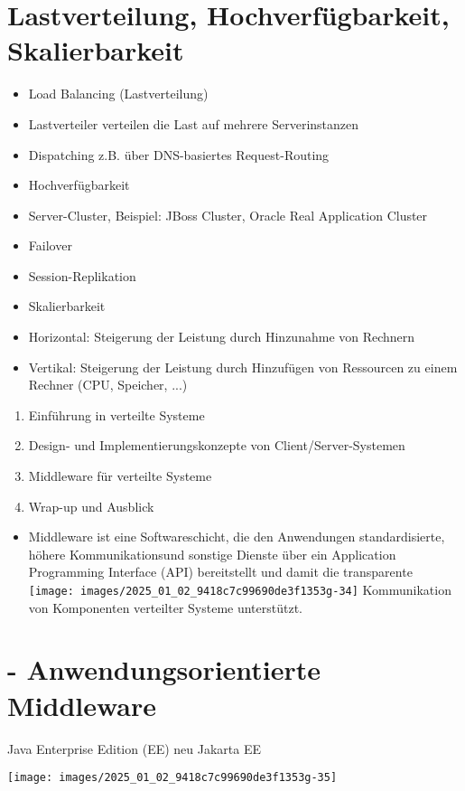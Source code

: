 \documentclass[10pt]{article}
\begin{document}
\section*{Lastverteilung, Hochverfügbarkeit, Skalierbarkeit}
\begin{itemize}
  \item Load Balancing (Lastverteilung)
  \item Lastverteiler verteilen die Last auf mehrere Serverinstanzen
  \item Dispatching z.B. über DNS-basiertes Request-Routing
  \item Hochverfügbarkeit
  \item Server-Cluster, Beispiel: JBoss Cluster, Oracle Real Application Cluster
  \item Failover
  \item Session-Replikation
  \item Skalierbarkeit
  \item Horizontal: Steigerung der Leistung durch Hinzunahme von Rechnern
  \item Vertikal: Steigerung der Leistung durch Hinzufügen von Ressourcen zu einem Rechner (CPU, Speicher, ...)
\end{itemize}

\begin{enumerate}
  \item Einführung in verteilte Systeme
  \item Design- und Implementierungskonzepte von Client/Server-Systemen
  \item Middleware für verteilte Systeme
  \item Wrap-up und Ausblick
\end{enumerate}

\begin{itemize}
  \item Middleware ist eine Softwareschicht, die den Anwendungen standardisierte, höhere Kommunikationsund sonstige Dienste über ein Application Programming Interface (API) bereitstellt und damit die transparente\\
\texttt{[image: images/2025\_01\_02\_9418c7c99690de3f1353g-34]} Kommunikation von Komponenten verteilter Systeme unterstützt.
\end{itemize}

\section*{- Anwendungsorientierte Middleware}
 Java Enterprise Edition (EE) neu Jakarta EE\begin{center}
\texttt{[image: images/2025\_01\_02\_9418c7c99690de3f1353g-35]}
\end{center}
\end{document}
